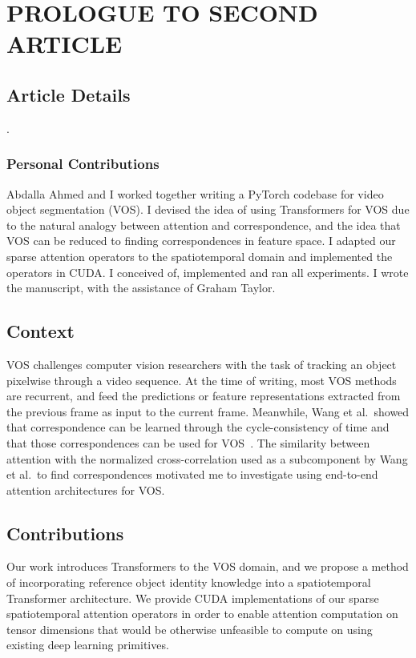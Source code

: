 \chapter{PROLOGUE TO SECOND ARTICLE}


\section{Article Details}

.

\subsection{Personal Contributions}

Abdalla Ahmed and I worked together writing a PyTorch codebase for video object
segmentation (VOS).
I devised the idea of using Transformers for VOS due to the natural analogy
between attention and correspondence, and the idea that VOS can be reduced to
finding correspondences in feature space.
I adapted our sparse attention operators to the spatiotemporal domain and
implemented the operators in CUDA.
I conceived of, implemented and ran all experiments.
I wrote the manuscript, with the assistance of Graham Taylor.


\section{Context}

VOS challenges computer vision researchers with the task of tracking an object
pixelwise through a video sequence.
At the time of writing, most VOS methods are recurrent, and feed the
predictions or feature representations extracted from the previous frame as
input to the current frame.
Meanwhile, Wang et al.\ showed that correspondence can be learned through the
cycle-consistency of time and that those correspondences can be used for
VOS~\cite{wang2019learning}.
The similarity between attention with the normalized cross-correlation used as
a subcomponent by Wang et al.\ to find correspondences motivated me to
investigate using end-to-end attention architectures for VOS\@.


\section{Contributions}

Our work introduces Transformers to the VOS domain, and we propose a method of
incorporating reference object identity knowledge into a spatiotemporal
Transformer architecture.
We provide CUDA implementations of our sparse spatiotemporal attention
operators in order to enable attention computation on tensor dimensions that
would be otherwise unfeasible to compute on using existing deep learning
primitives.

